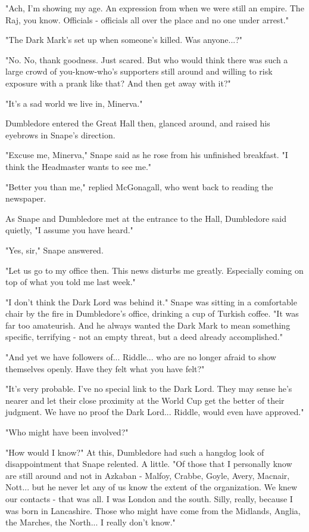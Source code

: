 "Ach, I'm showing my age. An expression from when we were still an empire. The Raj, you know. Officials - officials all over the place and no one under arrest."

"The Dark Mark's set up when someone's killed. Was anyone...?"

"No. No, thank goodness. Just scared. But who would think there was such a large crowd of you-know-who's supporters still around and willing to risk exposure with a prank like that? And then get away with it?"

"It's a sad world we live in, Minerva."

Dumbledore entered the Great Hall then, glanced around, and raised his eyebrows in Snape's direction.

"Excuse me, Minerva," Snape said as he rose from his unfinished breakfast. "I think the Headmaster wants to see me."

"Better you than me," replied McGonagall, who went back to reading the newspaper.

As Snape and Dumbledore met at the entrance to the Hall, Dumbledore said quietly, "I assume you have heard."

"Yes, sir," Snape answered.

"Let us go to my office then. This news disturbs me greatly. Especially coming on top of what you told me last week."

"I don't think the Dark Lord was behind it." Snape was sitting in a comfortable chair by the fire in Dumbledore's office, drinking a cup of Turkish coffee. "It was far too amateurish. And he always wanted the Dark Mark to mean something specific, terrifying - not an empty threat, but a deed already accomplished."

"And yet we have followers of... Riddle... who are no longer afraid to show themselves openly. Have they felt what you have felt?"

"It's very probable. I've no special link to the Dark Lord. They may sense he's nearer and let their close proximity at the World Cup get the better of their judgment. We have no proof the Dark Lord... Riddle, would even have approved."

"Who might have been involved?"

"How would I know?" At this, Dumbledore had such a hangdog look of disappointment that Snape relented. A little. "Of those that I personally know are still around and not in Azkaban - Malfoy, Crabbe, Goyle, Avery, Macnair, Nott... but he never let any of us know the extent of the organization. We knew our contacts - that was all. I was London and the south. Silly, really, because I was born in Lancashire. Those who might have come from the Midlands, Anglia, the Marches, the North... I really don't know."

